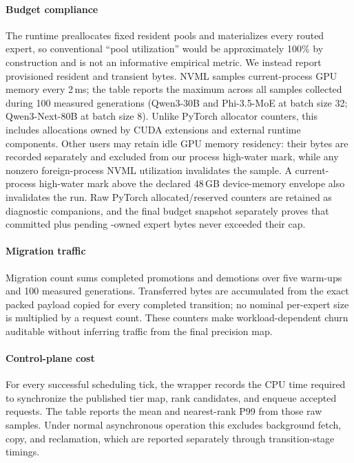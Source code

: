 \paragraph{Budget compliance}
The runtime preallocates fixed resident pools and materializes every routed expert, so conventional ``pool utilization'' would be approximately 100\% by construction and is not an informative empirical metric. We instead report provisioned resident and transient bytes. NVML samples current-process GPU memory every 2\,ms; the table reports the maximum across all samples collected during 100 measured generations (Qwen3-30B and Phi-3.5-MoE at batch size 32; Qwen3-Next-80B at batch size 8). Unlike PyTorch allocator counters, this includes allocations owned by CUDA extensions and external runtime components. Other users may retain idle GPU memory residency: their bytes are recorded separately and excluded from our process high-water mark, while any nonzero foreign-process NVML utilization invalidates the sample. A current-process high-water mark above the declared 48\,GB device-memory envelope also invalidates the run. Raw PyTorch allocated/reserved counters are retained as diagnostic companions, and the final budget snapshot separately proves that committed plus pending \systemname-owned expert bytes never exceeded their cap.

\paragraph{Migration traffic}
Migration count sums completed promotions and demotions over five warm-ups and 100 measured generations. Transferred bytes are accumulated from the exact packed payload copied for every completed transition; no nominal per-expert size is multiplied by a request count. These counters make workload-dependent churn auditable without inferring traffic from the final precision map.

\paragraph{Control-plane cost}
For every successful scheduling tick, the wrapper records the CPU time required to synchronize the published tier map, rank candidates, and enqueue accepted requests. The table reports the mean and nearest-rank P99 from those raw samples. Under normal asynchronous operation this excludes background fetch, copy, and reclamation, which are reported separately through transition-stage timings.


